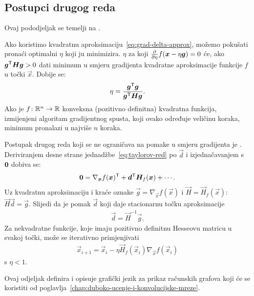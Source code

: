 \documentclass[utf8, diplomski, lmodern]{fer}
\begin{document}
\subsection{Postupci drugog reda}

Ovaj pododjeljak se temelji na \citet[pododjeljak 4.3.1]{Goodfellow:2016:DL}.

Ako koristimo kvadratnu aproksimaciju~\eqref{eq:grad-delta-approx}, možemo pokušati pronaći optimalni $\eta$ koji ju minimizira. $\eta$ za koji $\pd{}{\eta}f(\vec x-\eta\vec g)=0$ će, ako $\vec g^\tp\vec H\vec g>0$ dati minimum u smjeru gradijenta kvadratne aproksimacije funkcije $f$ u točki $\vec x$. Dobije se:
\begin{align}
\eta = \frac{\vec g^\tp \vec g}{\vec g^\tp\vec H\vec g} \text{.}
\end{align}
Ako je $f \colon \mathbb{R}^n \to \mathbb{R}$ konveksna (pozitivno definitna) kvadratna funkcija, izmijenjeni algoritam gradijentnog spusta, koji ovako određuje veličinu koraka, minimum pronalazi u najviše $n$ koraka. 

Postupak drugog reda koji se ne ograničava na pomake u smjeru gradijenta je . Deriviranjem desne strane jednadžbe~\eqref{eq:taylorov-red} po $\vec d$ i izjednačavanjem s $\mathbf{0}$ dobiva se:
\begin{align}
\cvec 0 = \nabla_{\vec x}f(\vec x)^\tp + \vec d^\tp\vec H_f(\vec x) + \cdots \text{.}
\end{align}
Uz kvadratnu aproksimaciju i kraće oznake $\vec g=\nabla_{\vec x}f(\vec x)$ i $\vec H=\vec H_f(\vec x)$: $\vec H\vec d = \vec g$. Slijedi da je pomak $\vec d$ koji daje stacionarnu točku aproksimacije
\begin{align}
\vec d = \vec H^{-1}\vec g \text{.}
\end{align}
Za nekvadratne funkcije, koje imaju pozitivno definitnu Hesseovu matricu u svakoj točki, može se iterativno primjenjivati
\begin{align}
\vec x_{i+1} = \vec x_i - \eta\vec H_f(\vec x_i)\nabla_{\vec x}f(\vec x_i)
\end{align}
s $\eta<1$.


\iffalse

Ovaj odjeljak definira  i opisuje grafički jezik za prikaz računskih grafova koji će se koristiti od poglavlja~\ref{chap:duboko-ucenje-i-konvolucijske-mreze}.
\end{document}
